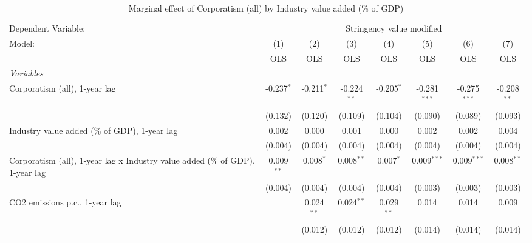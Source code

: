 
\begin{table}[htbp]
   \caption{Marginal effect of Corporatism (all) by Industry value added (\% of GDP)}
   \centering
   \begin{tabular}{lccccccc}
      \toprule
      Dependent Variable: & \multicolumn{7}{c}{Stringency value modified}\\
      Model:                                                                        & (1)          & (2)          & (3)           & (4)          & (5)            & (6)            & (7)\\  
                                                                                    &  OLS         & OLS          & OLS           & OLS          & OLS            & OLS            & OLS\\  
      \midrule
      \emph{Variables}\\
      Corporatism (all), 1-year lag                                                 & -0.237$^{*}$ & -0.211$^{*}$ & -0.224$^{**}$ & -0.205$^{*}$ & -0.281$^{***}$ & -0.275$^{***}$ & -0.208$^{**}$\\   
                                                                                    & (0.132)      & (0.120)      & (0.109)       & (0.104)      & (0.090)        & (0.089)        & (0.093)\\   
      Industry value added (\% of GDP), 1-year lag                                  & 0.002        & 0.000        & 0.001         & 0.000        & 0.002          & 0.002          & 0.004\\   
                                                                                    & (0.004)      & (0.004)      & (0.004)       & (0.004)      & (0.004)        & (0.004)        & (0.004)\\   
      Corporatism (all), 1-year lag x Industry value added (\% of GDP), 1-year lag  & 0.009$^{**}$ & 0.008$^{*}$  & 0.008$^{**}$  & 0.007$^{*}$  & 0.009$^{***}$  & 0.009$^{***}$  & 0.008$^{**}$\\   
                                                                                    & (0.004)      & (0.004)      & (0.004)       & (0.004)      & (0.003)        & (0.003)        & (0.003)\\   
      CO2 emissions p.c., 1-year lag                                                &              & 0.024$^{**}$ & 0.024$^{**}$  & 0.029$^{**}$ & 0.014          & 0.014          & 0.009\\   
                                                                                    &              & (0.012)      & (0.012)       & (0.012)      & (0.014)        & (0.014)        & (0.014)\\   

\end{tabular}
\end{table}
